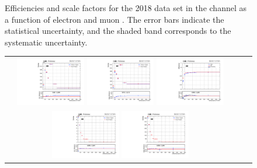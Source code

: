 \begin{figure}[!htb]
\begin{center}
\begin{tabular}{ccc}
    \end{tabular}
    \caption{Efficiencies and scale factors for the 2018 data set in the \emu channel as a function of electron and muon \pT.
            The error bars indicate the statistical uncertainty, and the shaded band corresponds to the systematic uncertainty.
            }
    \label{TrigSF_2018_1}
  \end{center}
\end{figure}

\begin{figure}[!htb]
  \begin{center}
    \begin{tabular}{ccc}
      \includegraphics[width=0.30\textwidth]{fig_2018_TrigSF/g_lepApt_ee_MC.pdf}
      \includegraphics[width=0.30\textwidth]{fig_2018_TrigSF/g_lepApt_ee_data.pdf}
      \includegraphics[width=0.30\textwidth]{fig_2018_TrigSF/g_ee_lepApt_FullSystUncBand.pdf}\\
      \includegraphics[width=0.30\textwidth]{fig_2018_TrigSF/g_lepBpt_ee_MC.pdf}
      \includegraphics[width=0.30\textwidth]{fig_2018_TrigSF/g_lepBpt_ee_data.pdf}

\end{tabular}
\end{center}
\end{figure}
